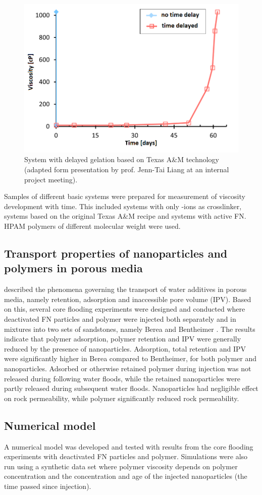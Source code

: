 \documentclass[nanomaterials,article,submit,moreauthors,pdftex]{Definitions/mdpi}
\begin{document}
\begin{figure}[h!]
    \centering
    \includegraphics[width=.5\textwidth]{fig/jennTai.png}
    \caption{System with delayed gelation based on Texas A\&M technology \citep{Cordova2008} (adapted form presentation by prof. Jenn-Tai Liang at an internal project meeting).}
    \label{cht:jennTai}
\end{figure}
    
Samples of different basic systems were prepared for measurement of viscosity development with time. This included systems with only -ions as crosslinker, systems based on the original Texas A\&M recipe \citep{Cordova2008} and systems with active FN. HPAM polymers of different molecular weight were used.
    
\subsection{Transport properties of nanoparticles and polymers in porous media}
\citet{Lotsch1985} described the phenomena governing the transport of water additives in porous media, namely retention, adsorption and inaccessible pore volume (IPV). Based on this, several core flooding experiments were designed and conducted where deactivated FN particles and polymer were injected both separately and in mixtures into two sets of sandstones, namely Berea and Bentheimer \citep{Najafiazar2016}. The results indicate that polymer adsorption, polymer retention and IPV were generally reduced by the presence of nanoparticles. Adsorption, total retention and IPV were significantly higher in Berea compared to Bentheimer, for both polymer and nanoparticles. Adsorbed or otherwise retained polymer during injection was not released during following water floods, while the retained nanoparticles were partly released during subsequent water floods. Nanoparticles had negligible effect on rock permeability, while polymer significantly reduced rock permeability.

\subsection{Numerical model}
A numerical model was developed and tested with results from the core flooding experiments with deactivated FN particles and polymer. Simulations were also run using a synthetic data set where polymer viscosity depends on polymer concentration and the concentration and age of the injected nanoparticles (the time passed since injection).
 
\end{document}
